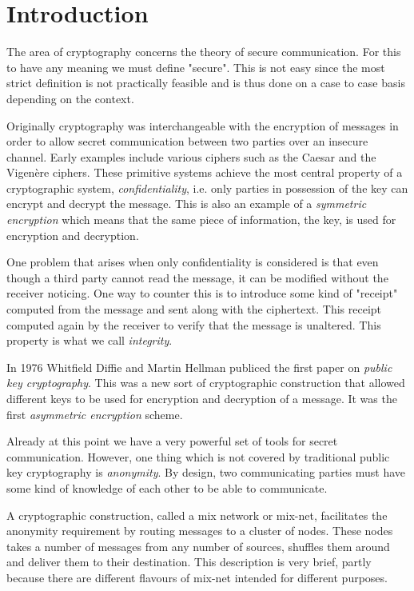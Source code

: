\section{Introduction}

The area of cryptography concerns the theory of secure
communication. For this to have any meaning we must define
"secure". This is not easy since the most strict definition is not
practically feasible and is thus done on a case to case basis
depending on the context.

Originally cryptography was interchangeable with the encryption of
messages in order to allow secret communication between two parties
over an insecure channel. Early examples include various ciphers such
as the Caesar and the Vigenère ciphers. These primitive systems
achieve the most central property of a cryptographic system,
\emph{confidentiality}, i.e. only parties in possession of the key can
encrypt and decrypt the message.\cite[p.~3]{hac} This is also an example of a
\emph{symmetric encryption} which means that the same piece of
information, the key, is used for encryption and decryption.

One problem that arises when only confidentiality is considered is
that even though a third party cannot read the message, it can be
modified without the receiver noticing. One way to counter this is to
introduce some kind of "receipt" computed from the message and sent
along with the ciphertext. This receipt computed again by the receiver
to verify that the message is unaltered. This property is what we call
\emph{integrity}.

In 1976 Whitfield Diffie and Martin Hellman publiced the first paper
on \emph{public key cryptography}.\cite[p.~2]{hac} This was a new sort of
cryptographic construction that allowed different keys to be used for
encryption and decryption of a message. It was the first
\emph{asymmetric encryption} scheme.

Already at this point we have a very powerful set of tools for secret
communication. However, one thing which is not covered by traditional
public key cryptography is \emph{anonymity}. By design, two
communicating parties must have some kind of knowledge of each other
to be able to communicate. 

A cryptographic construction, called a mix network or mix-net,
facilitates the anonymity requirement by routing messages to a cluster
of nodes.\cite[p.~1]{mixnet} These nodes takes a number of messages from any number of
sources, shuffles them around and deliver them to their
destination. This description is very brief, partly because there are
different flavours of mix-net intended for different purposes.

